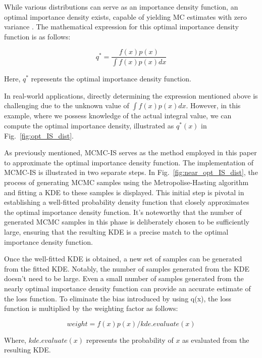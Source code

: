     While various distributions can serve as an importance density function, an optimal importance density exists, capable of yielding MC estimates with zero variance \cite{asmussen_stochastic_2007}. The mathematical expression for this optimal importance density function is as follows:
    
    $$q^*=\frac{f(x)p(x)}{\int f(x)p(x)dx}$$

    Here, $q^{*}$ represents the optimal importance density function.

    In real-world applications, directly determining the expression mentioned above is challenging due to the unknown value of $\int{f(x)}{p(x)}dx$. However, in this example, where we possess knowledge of the actual integral value, we can compute the optimal importance density, illustrated as $q^*(x)$ in Fig.~\ref{fig:opt_IS_dist}.

    
    
    As previously mentioned, MCMC-IS serves as the method employed in this paper to approximate the optimal importance density function. The implementation of MCMC-IS is illustrated in two separate steps. In Fig.~\ref{fig:near_opt_IS_dist}, the process of generating MCMC samples using the Metropolise-Hasting algorithm and fitting a KDE to these samples is displayed. This initial step is pivotal in establishing a well-fitted probability density function that closely approximates the optimal importance density function. It's noteworthy that the number of generated MCMC samples in this phase is deliberately chosen to be sufficiently large, ensuring that the resulting KDE is a precise match to the optimal importance density function.

    

    Once the well-fitted KDE is obtained, a new set of samples can be generated from the fitted KDE. Notably, the number of samples generated from the KDE doesn't need to be large. Even a small number of samples generated from the nearly optimal importance density function can provide an accurate estimate of the loss function. To eliminate the bias introduced by using q(x), the loss function is multiplied by the weighting factor as follows:

    $$weight=f(x)p(x)/kde.evaluate(x)$$

    Where, $kde.evaluate(x)$ represents the probability of $x$ as evaluated from the resulting KDE.
    
